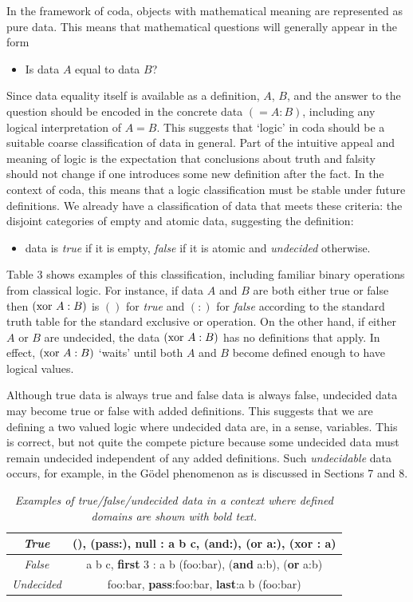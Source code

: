 \documentclass[11pt]{article}
\begin{document}
    In the framework of coda, objects with mathematical meaning are represented as pure data.  This means that mathematical
questions will generally appear in the form
\begin{itemize}
\item[] Is data $A$ equal to data $B$?
\end{itemize}
Since data equality itself is available as a definition, $A$, $B$, and the answer to the question should be
encoded in the concrete data $(=A:B)$, including any logical interpretation of $A=B$.
This suggests that `logic' in coda should be a suitable coarse classification of data in general.  Part of the
intuitive appeal and meaning of logic is the expectation that conclusions about truth and falsity should
not change if one introduces some new definition after the fact.  In the context of coda, this means that
a logic classification must be stable under future definitions.  We already have a classification of data
that meets these criteria: the disjoint categories of empty and atomic data, suggesting the definition:
\begin{itemize}
\item data is {\it true} if it is empty, {\it false} if it is atomic and {\it undecided} otherwise.
\end{itemize}
Table 3 shows examples of this classification, including familiar binary operations from classical logic.
For instance, if data $A$ and $B$ are both either true or false then $({\rm xor}\ A:B)$ is $()$ for {\it true} and $(:)$ for {\it false} according to the standard truth
 table for the standard exclusive or operation.  On the other hand, if either $A$ or $B$ are
undecided, the data $({\rm xor}\ A:B)$ has no definitions that apply.  In effect, $({\rm xor}\ A:B)$ `waits' until both $A$ and $B$ become defined
enough to have logical values.

     Although true data is always true and false data is always false, undecided data may become true or false with added definitions.
This suggests that we are defining a two valued logic where undecided data are, in a sense, variables.  This is correct, but
not quite the compete picture because some undecided data must remain undecided independent of any added definitions.
Such {\it undecidable} data occurs, for example, in the G\"{o}del phenomenon as is discussed in Sections 7 and 8.
\begin{table}
\begin{center}
\begin{tabular}{ | c | c | }
\hline
 {\it True} & (), ({\bf pass}:), {\bf null} : a b c, ({\bf and}:), ({\bf or} a:), ({\bf xor} : a)  \\
 \hline
 {\it False} & a b c, {\bf first} 3 : a b (foo:bar), ({\bf and} a:b), ({\bf or} a:b)  \\
 \hline
 {\it Undecided} & foo:bar, {\bf pass}:foo:bar, {\bf last}:a b (foo:bar)  \\
 \hline
\end{tabular}
\end{center}
\caption{\label{ }{\it Examples of true/false/undecided data in a context where defined domains are shown with bold text.}}
\end{table}
\end{document}
